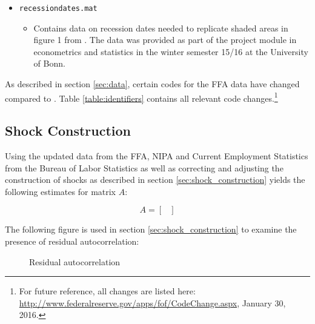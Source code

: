 \begin{itemize}
\item \texttt{recessiondates.mat}
	\begin{itemize}
		\item Contains data on recession dates needed to replicate shaded areas in figure 1 from \cite{JERMANNfinancial}. The data was provided as part of the project module in econometrics and statistics in the winter semester 15/16 at the University of Bonn.
	\end{itemize}

\end{itemize}

As described in section \ref{sec:data}, certain codes for the FFA data have changed compared to \citeauthor{JERMANNfinancial}. Table \ref{table:identifiers} contains all relevant code changes.\footnote{For future reference, all changes are listed here: \href{http://www.federalreserve.gov/apps/fof/CodeChange.aspx}{http://www.federalreserve.gov/apps/fof/CodeChange.aspx}, January 30, 2016.} 




\subsection{Shock Construction}
\label{sec:appendix_shock_construction}

Using the updated data from the FFA, NIPA and Current Employment Statistics from the Bureau of Labor Statistics as well as correcting and adjusting the construction of shocks as described in section \ref{sec:shock_construction} yields the following estimates for matrix $A$:
\begin{center}
\[
    A=
      \begin{bmatrix}
    	
      \end{bmatrix}
\]
\end{center}

The following figure is used in section \ref{sec:shock_construction} to examine the presence of residual autocorrelation:

\begin{figure}[ht]
	\caption{Residual autocorrelation}
	\label{fig:residual_autocorrelation}
\end{figure}
